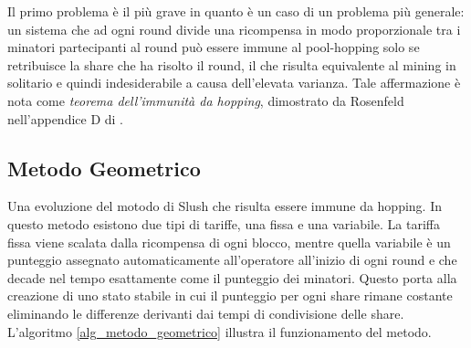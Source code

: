 Il primo problema è il più grave in quanto è un caso di un problema più generale: un sistema che ad ogni round divide una ricompensa in modo proporzionale tra i minatori partecipanti al round può essere immune al pool-hopping solo se retribuisce la share che ha risolto il round, il che risulta equivalente al mining in solitario e quindi indesiderabile a causa dell'elevata varianza. Tale affermazione è nota come \emph{teorema dell'immunità da hopping}, dimostrato da Rosenfeld nell'appendice D di \cite{pool-analysis}.

\subsection{Metodo Geometrico}

Una evoluzione del motodo di Slush che risulta essere immune da hopping.
In questo metodo esistono due tipi di tariffe, una fissa e una variabile. La tariffa fissa viene scalata dalla ricompensa di ogni blocco, mentre quella variabile è un punteggio assegnato automaticamente all'operatore all'inizio di ogni round e che decade nel tempo esattamente come il punteggio dei minatori.
Questo porta alla creazione di uno stato stabile in cui il punteggio per ogni share rimane costante eliminando le differenze derivanti dai tempi di condivisione delle share. L'algoritmo \ref{alg_metodo_geometrico} illustra il funzionamento del metodo.



